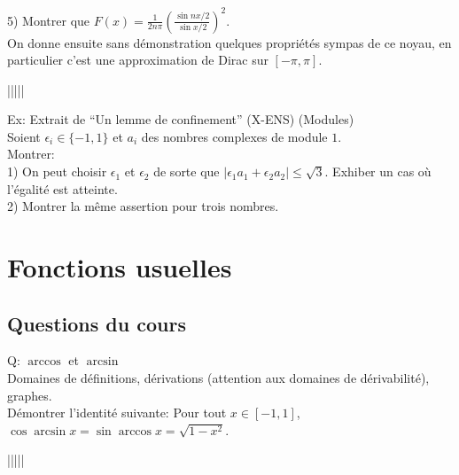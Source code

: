 \documentclass{article}
\begin{document}
5) Montrer que $F(x)=\frac{1}{2n\pi}(\frac{\sin nx/2}{\sin x/2})^2$.\\
On donne ensuite sans d\'emonstration quelques propri\'et\'es sympas de ce noyau, en particulier c'est une approximation de Dirac sur $[-\pi,\pi]$.
\begin{center}
|||||
\end{center}
Ex: Extrait de ``Un lemme de confinement'' (X-ENS) (Modules)\\
Soient $\epsilon_{i}\in\{-1,1\}$ et $a_{i}$ des nombres complexes de module $1$.\\
Montrer:\\
1) On peut choisir $\epsilon_1$ et $\epsilon_2$ de sorte que $|\epsilon_1 a_1+\epsilon_2 a_2|\leq\sqrt{3}$. Exhiber un cas o\`u l'\'egalit\'e est atteinte.\\
2) Montrer la m\^eme assertion pour trois nombres.

\section{Fonctions usuelles}
\subsection{Questions du cours}
Q: $\arccos$ et $\arcsin$\\
Domaines de d\'efinitions, d\'erivations (attention aux domaines de d\'erivabilit\'e), graphes.\\
D\'emontrer l'identit\'e suivante: Pour tout $x\in[-1,1]$, $\cos\arcsin x=\sin\arccos x=\sqrt{1-x^2}$.
\begin{center}
|||||
\end{center}
\end{document}
